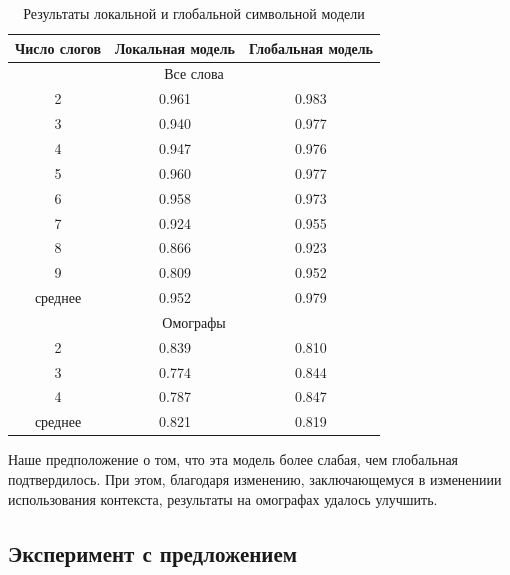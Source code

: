 \documentclass[14pt, a4paper, russian]{extreport}
\begin{document}
\begin{table}[H]
		\caption{Результаты локальной и глобальной символьной модели}
	
	\begin{small}
		\begin{center}
			\begin{tabular}{|c|c|c|}
				\hline
				Число слогов & Локальная модель & Глобальная модель \\ \hline
				\multicolumn{3}{|c|}{Все слова}                     \\ \hline
				     2       &      0.961       &       0.983       \\ \hline
				     3       &      0.940       &       0.977       \\ \hline
				     4       &      0.947       &       0.976       \\ \hline
				     5       &      0.960       &       0.977       \\ \hline
				     6       &      0.958       &       0.973       \\ \hline
				     7       &      0.924       &       0.955       \\ \hline
				     8       &      0.866       &       0.923       \\ \hline
				     9       &      0.809       &       0.952       \\ \hline
				  среднее    &      0.952       &       0.979       \\ \hline
				\multicolumn{3}{|c|}{Омографы}                      \\ \hline
				     2       &      0.839       &       0.810       \\ \hline
				     3       &      0.774       &       0.844       \\ \hline
				     4       &      0.787       &       0.847       \\ \hline
				  среднее    &      0.821       &       0.819       \\ \hline
			\end{tabular}
		\end{center}
	\end{small}
	\label{table:local_char}
\end{table}	

Наше предположение о том, что эта модель более слабая, чем глобальная подтвердилось. При этом, благодаря изменению, заключающемуся в изменениии использования контекста, результаты на омографах удалось улучшить.

\subsection{Эксперимент с предложением}
\end{document}
